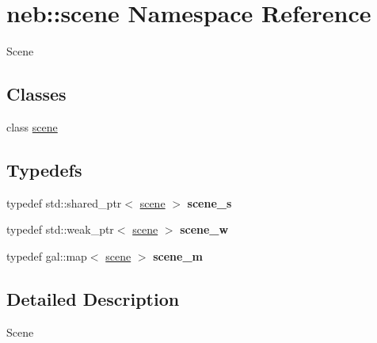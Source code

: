 \hypertarget{namespaceneb_1_1scene}{\section{neb\-:\-:scene \-Namespace \-Reference}
\label{namespaceneb_1_1scene}
}


\-Scene  


\subsection*{\-Classes}
\begin{DoxyCompactItemize}
\item 
class \hyperlink{classneb_1_1scene_1_1scene}{scene}
\end{DoxyCompactItemize}
\subsection*{\-Typedefs}
\begin{DoxyCompactItemize}
\item 
\hypertarget{namespaceneb_1_1scene_ad06b7e9387d18f1b35664adad68d352f}{typedef std\-::shared\-\_\-ptr$<$ \hyperlink{classneb_1_1scene_1_1scene}{scene} $>$ {\bfseries scene\-\_\-s}}\label{namespaceneb_1_1scene_ad06b7e9387d18f1b35664adad68d352f}

\item 
\hypertarget{namespaceneb_1_1scene_ac2d204a7fce21009499b360c1467e20d}{typedef std\-::weak\-\_\-ptr$<$ \hyperlink{classneb_1_1scene_1_1scene}{scene} $>$ {\bfseries scene\-\_\-w}}\label{namespaceneb_1_1scene_ac2d204a7fce21009499b360c1467e20d}

\item 
\hypertarget{namespaceneb_1_1scene_ad5e641229fe2e5f5ecf306021c841b3c}{typedef gal\-::map$<$ \hyperlink{classneb_1_1scene_1_1scene}{scene} $>$ {\bfseries scene\-\_\-m}}\label{namespaceneb_1_1scene_ad5e641229fe2e5f5ecf306021c841b3c}

\end{DoxyCompactItemize}


\subsection{\-Detailed \-Description}
\-Scene 